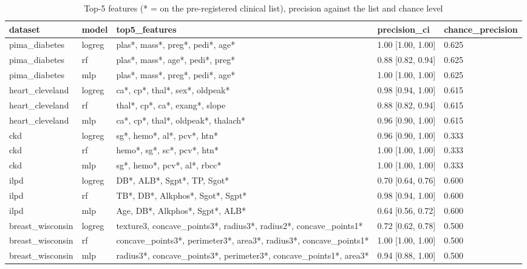 \begin{table}[t]
\centering
\scriptsize
\caption{Top-5 features (* = on the pre-registered clinical list), precision against the list and chance level}
\begin{tabular}{lllll}
\toprule
dataset & model & top5\_features & precision\_ci & chance\_precision \\
\midrule
pima\_diabetes & logreg & plas*, mass*, preg*, pedi*, age* & 1.00 [1.00, 1.00] & 0.625 \\
pima\_diabetes & rf & plas*, mass*, age*, pedi*, preg* & 0.88 [0.82, 0.94] & 0.625 \\
pima\_diabetes & mlp & plas*, mass*, preg*, pedi*, age* & 1.00 [1.00, 1.00] & 0.625 \\
heart\_cleveland & logreg & ca*, cp*, thal*, sex*, oldpeak* & 0.98 [0.94, 1.00] & 0.615 \\
heart\_cleveland & rf & thal*, cp*, ca*, exang*, slope & 0.88 [0.82, 0.94] & 0.615 \\
heart\_cleveland & mlp & ca*, cp*, thal*, oldpeak*, thalach* & 0.96 [0.90, 1.00] & 0.615 \\
ckd & logreg & sg*, hemo*, al*, pcv*, htn* & 0.96 [0.90, 1.00] & 0.333 \\
ckd & rf & hemo*, sg*, sc*, pcv*, htn* & 1.00 [1.00, 1.00] & 0.333 \\
ckd & mlp & sg*, hemo*, pcv*, al*, rbcc* & 1.00 [1.00, 1.00] & 0.333 \\
ilpd & logreg & DB*, ALB*, Sgpt*, TP, Sgot* & 0.70 [0.64, 0.76] & 0.600 \\
ilpd & rf & TB*, DB*, Alkphos*, Sgot*, Sgpt* & 0.98 [0.94, 1.00] & 0.600 \\
ilpd & mlp & Age, DB*, Alkphos*, Sgpt*, ALB* & 0.64 [0.56, 0.72] & 0.600 \\
breast\_wisconsin & logreg & texture3, concave\_points3*, radius3*, radius2*, concave\_points1* & 0.72 [0.62, 0.78] & 0.500 \\
breast\_wisconsin & rf & concave\_points3*, perimeter3*, area3*, radius3*, concave\_points1* & 1.00 [1.00, 1.00] & 0.500 \\
breast\_wisconsin & mlp & radius3*, concave\_points3*, perimeter3*, concave\_points1*, area3* & 0.94 [0.88, 1.00] & 0.500 \\
\bottomrule
\end{tabular}
\end{table}
